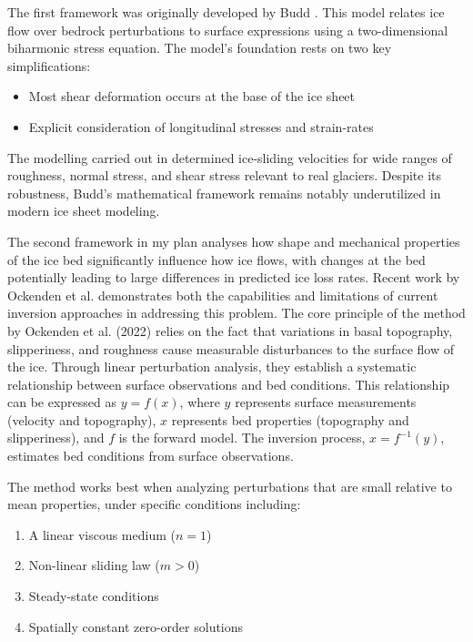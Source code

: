 The first framework was originally developed by Budd \cite{Budd_1970}. This model relates ice flow over bedrock perturbations to surface expressions using a two-dimensional biharmonic stress equation. The model's foundation rests on two key simplifications:
\begin{itemize}
    \item Most shear deformation occurs at the base of the ice sheet
    \item Explicit consideration of longitudinal stresses and strain-rates
\end{itemize}

The modelling carried out in\cite{Budd_1970} determined ice-sliding velocities for wide ranges of roughness, normal stress, and shear stress relevant to real glaciers\cite{Budd_1970}. Despite its robustness, Budd's mathematical framework remains notably underutilized in modern ice sheet modeling. 

The second framework in my plan analyses how shape and mechanical properties of the ice bed significantly influence how ice flows, with changes at the bed potentially leading to large differences in predicted ice loss rates\cite{Ockenden_2022}. Recent work by Ockenden et al. demonstrates both the capabilities and limitations of current inversion approaches in addressing this problem.
The core principle of the method by Ockenden et al. (2022) relies on the fact that variations in basal topography, slipperiness, and roughness cause measurable disturbances to the surface flow of the ice. Through linear perturbation analysis, they establish a systematic relationship between surface observations and bed conditions. This relationship can be expressed as $y=f(x)$, where $y$ represents surface measurements (velocity and topography), $x$ represents bed properties (topography and slipperiness), and $f$ is the forward model\cite{Gudmundsson_2008}. The inversion process, $x=f^{-1}(y)$, estimates bed conditions from surface observations.%

The method works best when analyzing perturbations that are small relative to mean properties, under specific conditions including:
\begin{enumerate}
    \item A linear viscous medium ($n=1$)
    \item Non-linear sliding law ($m>0$)
    \item Steady-state conditions
    \item Spatially constant zero-order solutions
\end{enumerate}

